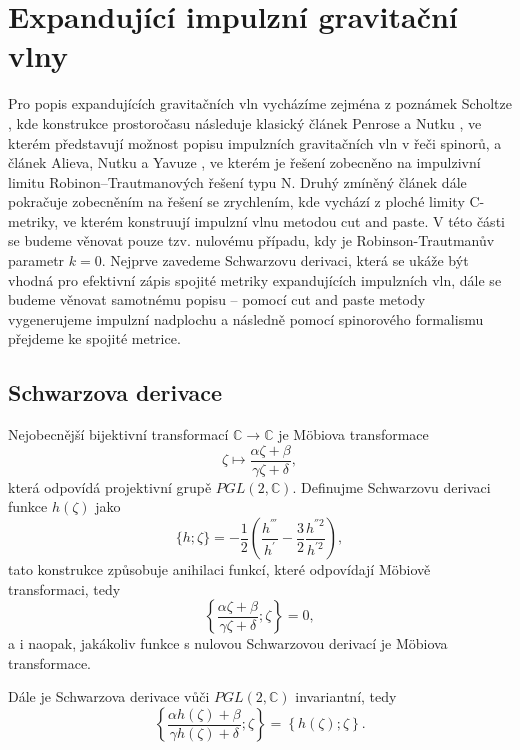 \section{Expandující impulzní gravitační vlny}
Pro popis expandujících gravitačních vln vycházíme zejména z poznámek Scholtze \cite{scholtz_notes}, kde konstrukce prostoročasu následuje klasický článek
Penrose a Nutku \cite{PenroseNutku1992}, ve kterém představují možnost popisu impulzních gravitačních vln v řeči spinorů, a článek Alieva, Nutku a Yavuze \cite{Aliev2001},
ve kterém je řešení zobecněno na impulzivní limitu Robinon--Trautmanových řešení typu N.
Druhý zmíněný článek dále pokračuje zobecněním na řešení se zrychlením, kde vychází z ploché limity C-metriky, ve kterém konstruují impulzní vlnu metodou cut and paste.
V této části se budeme věnovat pouze tzv. nulovému případu, kdy je Robinson-Trautmanův parametr $k=0$.
Nejprve zavedeme Schwarzovu derivaci, která se ukáže být vhodná pro efektivní zápis spojité metriky expandujících impulzních vln,
dále se budeme věnovat samotnému popisu -- pomocí cut and paste metody vygenerujeme impulzní nadplochu a následně pomocí spinorového
formalismu přejdeme ke spojité metrice.
\subsection{Schwarzova derivace}
Nejobecnější bijektivní transformací $\mathbb{C} \to \mathbb{C}$ je Möbiova transformace
\begin{equation}
    \zeta \mapsto \frac{\alpha \zeta + \beta}{\gamma \zeta + \delta},
\end{equation}
která odpovídá projektivní grupě $PGL(2, \mathbb{C})$. Definujme Schwarzovu derivaci funkce $h(\zeta)$ jako
\begin{equation}
    \{h; \zeta\} = -\frac{1}{2}\left(\frac{h^{'''}}{h^{'}} - \frac{3}{2} \frac{h^{''2}}{h^{'2}}\right),
\end{equation}
tato konstrukce způsobuje anihilaci funkcí, které odpovídají Möbiově transformaci, tedy
\begin{equation}
    \left\{ \frac{\alpha \zeta + \beta}{\gamma \zeta + \delta}; \zeta \right\} = 0,
\end{equation}
a i naopak, jakákoliv funkce s nulovou Schwarzovou derivací je Möbiova transformace.

Dále je Schwarzova derivace vůči $PGL(2, \mathbb{C})$ invariantní, tedy
\begin{equation}
    \left\{ \frac{\alpha h(\zeta) + \beta}{\gamma h(\zeta) + \delta} ; \zeta \right\} = \left\{ h(\zeta); \zeta \right\}.
\end{equation}

